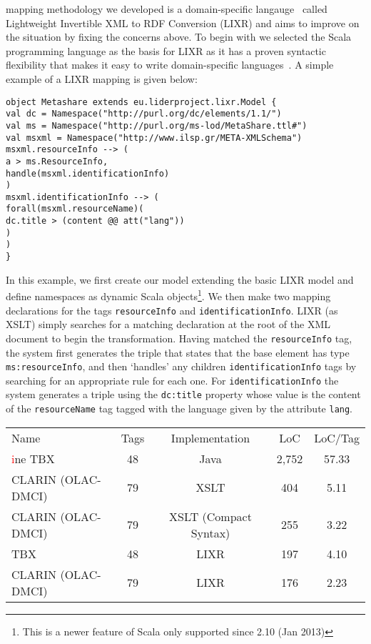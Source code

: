 \documentclass{llncs}
\begin{document}
{mapping methodology we developed is a domain-specific
langauge~\cite{fowler2010domain} called Lightweight Invertible XML to RDF
Conversion (LIXR) and aims to improve on the situation by fixing the concerns
above.
To begin with we selected the Scala programming language as the basis for LIXR
as it has a proven syntactic flexibility that makes it easy to write
domain-specific languages~\cite{wampler2008programming}. A simple example of a
LIXR mapping is given below:
{\footnotesize
\begin{verbatim}
object Metashare extends eu.liderproject.lixr.Model {
val dc = Namespace("http://purl.org/dc/elements/1.1/")
val ms = Namespace("http://purl.org/ms-lod/MetaShare.ttl#")
val msxml = Namespace("http://www.ilsp.gr/META-XMLSchema")
msxml.resourceInfo --> (
a > ms.ResourceInfo,
handle(msxml.identificationInfo)
)
msxml.identificationInfo --> (
forall(msxml.resourceName)(
dc.title > (content @@ att("lang"))
)
)
}
\end{verbatim}}
In this example, we first create our model extending the basic LIXR model and
define namespaces as dynamic Scala objects\footnote{This is a newer feature of
Scala only supported since 2.10 (Jan 2013)}. We then make two mapping
declarations for the tags {\tt resourceInfo} and {\tt identificationInfo}. LIXR (as
XSLT) simply searches for a matching declaration at the root of the XML document
to begin the transformation. Having matched the {\tt resourceInfo} tag, the system
first generates the triple that states that the base element has type
{\tt ms:resourceInfo}, and then `handles' any children {\tt identificationInfo} tags by
searching for an appropriate rule for each one. For {\tt identificationInfo} the
system generates a triple using the {\tt dc:title} property whose value is the
content of the {\tt resourceName} tag tagged with the language given by the
attribute {\tt lang}.
\begin{table}
\begin{center}
\begin{tabular}{p{4cm}|cccc}
Name & Tags & Implementation & LoC & LoC/Tag \\
\textcolor{red}ine
TBX & 48 & Java & 2,752 & 57.33 \\
CLARIN (OLAC-DMCI) & 79 & XSLT & 404 & 5.11 \\
CLARIN (OLAC-DMCI) & 79 & XSLT (Compact Syntax) & 255 & 3.22 \\
\hline
TBX & 48 & LIXR & 197 & 4.10 \\
CLARIN (OLAC-DMCI) & 79 & LIXR & 176 & 2.23 \\

\end{tabular}
\end{center}
\end{table}}
\end{document}
